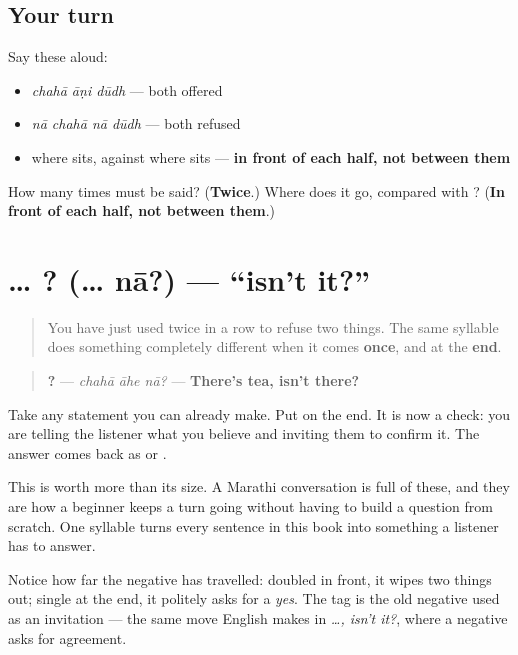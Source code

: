 \subsection*{Your turn}
Say these aloud:

\begin{itemize}
\raggedright
  \item \emph{chahā āṇi dūdh} — both offered
  \item \emph{nā chahā nā dūdh} — both refused
  \item where \textbf{} sits, against where \textbf{} sits — \textbf{in front of each half, not between them}
\end{itemize}

\begin{tcolorbox}[breakable,colback=teal!4,colframe=teal!35!black,title={Before you move on}]
How many times must \textbf{} be said? (\textbf{Twice}.) Where does it go, compared with \textbf{}? (\textbf{In front of each half, not between them}.)
\end{tcolorbox}
\section[\texorpdfstring{… \mr{ना}? (… nā?)}{… ना? (… nā?)}]{… ? (… nā?) — \textquotedblleft{}isn't it?\textquotedblright{}}

\label{lesson:MR-C31-naa-tag}



\begin{quote}
You have just used \textbf{} twice in a row to refuse two things. The same syllable does something completely different when it comes \textbf{once}, and at the \textbf{end}.
\end{quote}

\begin{grammarlens}[title={Grammar Lens: hanging a check on the end}]
\begin{quote}
\textbf{  ?} — \emph{chahā āhe nā?} — \textbf{There's tea, isn't there?}
\end{quote}

Take any statement you can already make. Put \textbf{} on the end. It is now a check: you are telling the listener what you believe and inviting them to confirm it. The answer comes back as \textbf{} or \textbf{}.

This is worth more than its size. A Marathi conversation is full of these, and they are how a beginner keeps a turn going without having to build a question from scratch. One syllable turns every sentence in this book into something a listener has to answer.

Notice how far the negative \textbf{} has travelled: doubled in front, it wipes two things out; single at the end, it politely asks for a \emph{yes}. The tag is the old negative used as an invitation — the same move English makes in \emph{…, isn't it?}, where a negative asks for agreement.
\end{grammarlens}

